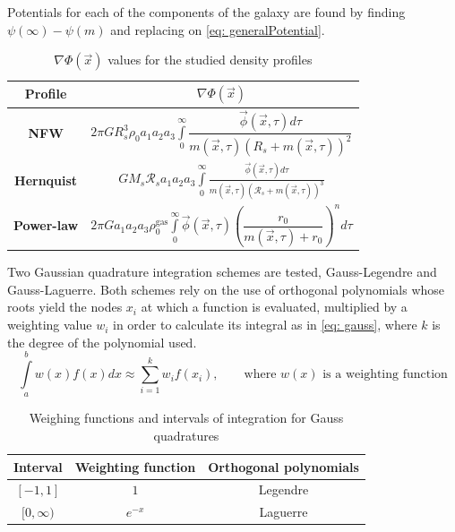 		Potentials for each of the components of the galaxy are found by finding $\psi(\infty) - \psi(m)$ and replacing on \autoref{eq: generalPotential}.
		
		
	
		\begin{table}[h]
			\centering
			\caption{$\nabla\Phi(\vec{x})$ values for the studied density profiles}
			\label{tb: gradients}
			\begin{tabular}{c|c}
				\hline
				\textbf{Profile} & $\nabla \Phi(\vec{x})$\\
				\hline
				\rule{0pt}{4ex}
				\textbf{NFW} & $2 \pi G R_{s}^{3}\rho_0 a_{1} a_{2} a_{3} \displaystyle\int\limits_{0}^{\infty}
				\dfrac{\vec{\phi}(\vec{x}, \tau) d\tau}{m(\vec{x}, \tau)\left(R_{s} + m(\vec{x}, \tau)\right)^{2}}$ \\
				\textbf{Hernquist} &  $G M_{s} \mathcal{R}_s a_{1} a_{2} a_{3} \displaystyle\int\limits_{0}^{\infty} \frac{ \vec{\phi}(\vec{x}, \tau) d\tau}{m(\vec{x}, \tau)\left(\mathcal{R}_s + m(\vec{x}, \tau)\right)^{3}}$ \\
				\textbf{Power-law} & $2 \pi G a_{1} a_{2} a_{3}  \rho_{0}^\text{gas}  \displaystyle\int\limits_{0}^{\infty}\vec{\phi}(\vec{x}, \tau)\left(\dfrac{r_{0}}{m(\vec{x}, \tau) + r_{0}}\right)^{n}d\tau$\\
				\hline
			\end{tabular}
			
		\end{table}	
		
		Two Gaussian quadrature integration schemes are tested, Gauss-Legendre and Gauss-Laguerre. Both schemes rely on the use of orthogonal polynomials whose roots yield the nodes $x_i$ at which a function is evaluated, multiplied by a weighting value $w_i$ in order to calculate its integral as in \autoref{eq: gauss}, where $k$ is the degree of the polynomial used.
		\begin{equation}\label{eq: gauss}
			\int\limits_{a}^{b} w(x)f(x)dx \approx \sum_{i = 1}^{k}w_i f(x_i), \qquad \text{where $w(x)$ is a weighting function}
		\end{equation}
		
		\begin{table}[h]
			\centering
			\caption{Weighing functions and intervals of integration for Gauss quadratures}
			\begin{tabular}{ccc}
				\hline
				\textbf{Interval} & \textbf{Weighting function} & \textbf{Orthogonal polynomials} \\
				\hline
				$[-1, 1]$ & $1$ & Legendre \\
				$[0, \infty)$ & $e^{-x}$ & Laguerre \\
				\hline
			\end{tabular}
		\end{table}
		
